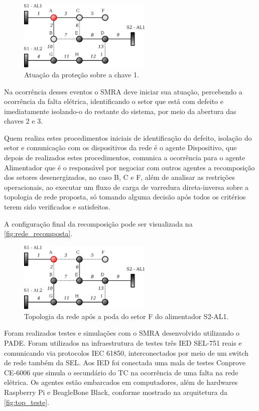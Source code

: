 \documentclass[journal]{IEEEtran}
\begin{document}
\begin{figure}[htb]
    \centering
    \includegraphics[width=2.5in]{Figuras/rede_curto_A.eps}
    \caption{\label{fig:teste_1_1} Atuação da proteção sobre a chave 1.}
\end{figure} 

Na ocorrência desses eventos o SMRA deve iniciar sua atuação, percebendo a ocorrência da falta elétrica, identificando o setor que está com defeito e imediatamente isolando-o do restante do sistema, por meio da abertura das chaves 2 e 3.

Quem realiza estes procedimentos iniciais de identificação do defeito, isolação do setor e comunicação com os dispositivos da rede é o agente Dispositivo, que depois de realizados estes procedimentos, comunica a ocorrência para o agente Alimentador que é o responsável por negociar com outros agentes a recomposição dos setores desenergizados, no caso B, C e F, além de analisar as restrições operacionais, ao executar um fluxo de carga de varredura direta-inversa sobre a topologia de rede proposta, só tomando alguma decisão após todos os critérios terem sido verificados e satisfeitos.  

A configuração final da recomposição pode ser visualizada na \autoref{fig:rede_recomposta}. 

\begin{figure}[htb]
    \centering
    \includegraphics[width=2.5in]{Figuras/rede_recomposta.eps}
    \caption{\label{fig:rede_recomposta} Topologia da rede após a poda do setor F do alimentador S2-AL1.}
\end{figure}

Foram realizados testes e simulações com o SMRA desenvolvido utilizando o PADE. Foram utilizados na infraestrutura de testes três IED SEL-751 reais e comunicando via protocolos IEC 61850, interconectados por meio de um switch de rede também da SEL. Aos IED foi conectada uma mala de testes Conprove CE-6006 que simula o secundário do TC na ocorrência de uma falta na rede elétrica. Os agentes estão embarcados em computadores, além de hardwares Raspberry Pi e BeagleBone Black, conforme mostrado na arquitetura da \autoref{fig:top_teste}.
\end{document}
